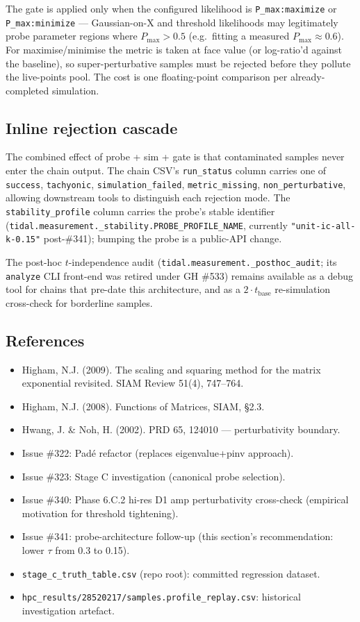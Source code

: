 The gate is applied only when the configured likelihood is
\texttt{P\_max:maximize} or \texttt{P\_max:minimize} — Gaussian-on-X
and threshold likelihoods may legitimately probe parameter regions
where $P_{\max} > 0.5$ (e.g.\ fitting a measured $P_{\max} \approx
0.6$). For maximise/minimise the metric is taken at face value (or
log-ratio'd against the baseline), so super-perturbative samples must
be rejected before they pollute the live-points pool. The cost is
one floating-point comparison per already-completed simulation.

\subsection{Inline rejection cascade}

The combined effect of probe + sim + gate is that contaminated
samples never enter the chain output. The chain CSV's
\texttt{run\_status} column carries one of
\texttt{success}, \texttt{tachyonic}, \texttt{simulation\_failed},
\texttt{metric\_missing}, \texttt{non\_perturbative}, allowing
downstream tools to distinguish each rejection mode. The
\texttt{stability\_profile} column carries the probe's stable
identifier
(\texttt{tidal.measurement.\_stability.PROBE\_PROFILE\_NAME},
currently \texttt{"unit-ic-all-k-0.15"} post-\#341); bumping the probe is a
public-API change.

The post-hoc $t$-independence audit
(\texttt{tidal.measurement.\_posthoc\_audit}; its \texttt{analyze} CLI
front-end was retired under GH \#533) remains available as a debug
tool for chains that pre-date this architecture, and as a
$2 \cdot t_{\text{base}}$ re-simulation cross-check for borderline
samples.

\subsection{References}

\begin{itemize}
\item Higham, N.J. (2009). The scaling and squaring method for the
matrix exponential revisited. SIAM Review 51(4), 747--764.
\item Higham, N.J. (2008). Functions of Matrices, SIAM, \S 2.3.
\item Hwang, J. \& Noh, H. (2002). PRD 65, 124010 — perturbativity
boundary.
\item Issue \#322: Pad\'e refactor (replaces eigenvalue+pinv approach).
\item Issue \#323: Stage C investigation (canonical probe selection).
\item Issue \#340: Phase 6.C.2 hi-res D1 amp perturbativity cross-check
(empirical motivation for threshold tightening).
\item Issue \#341: probe-architecture follow-up (this section's
recommendation: lower $\tau$ from 0.3 to 0.15).
\item \texttt{stage\_c\_truth\_table.csv} (repo root): committed
regression dataset.
\item \texttt{hpc\_results/28520217/samples.profile\_replay.csv}:
historical investigation artefact.
\end{itemize}
